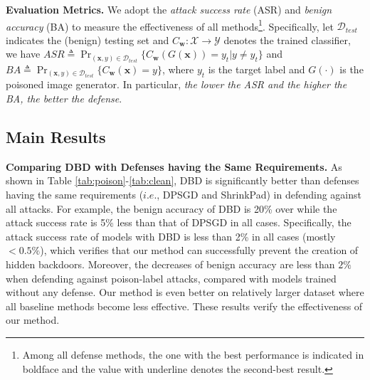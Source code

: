 \noindent \textbf{Evaluation Metrics.} 
We adopt the \emph{attack success rate} (ASR) and \emph{benign accuracy} (BA) to measure the effectiveness of all methods\footnote{Among all defense methods, the one with the best performance is indicated in boldface and the value with underline denotes the second-best result.}. Specifically, let $\mathcal{D}_{test}$ indicates the (benign) testing set and $C_{\bm{w}}: \mathcal{X} \rightarrow \mathcal{Y}$ denotes the trained classifier, we have $ASR \triangleq \Pr_{(\bm{x},y) \in \mathcal{D}_{test}}\{C_{\bm{w}}(G(\bm{x}))=y_t|y \neq y_t\}$ and $BA \triangleq \Pr_{(\bm{x},y) \in \mathcal{D}_{test}}\{C_{\bm{w}}(\bm{x})=y\}$, where $y_t$ is the target label and $G(\cdot)$ is the poisoned image generator. In particular, \emph{the lower the ASR and the higher the BA, the better the defense}. 

\subsection{Main Results}
\label{sec:main}

\noindent \textbf{Comparing DBD with Defenses having the Same Requirements.}
As shown in Table \ref{tab:poison}-\ref{tab:clean}, DBD is significantly better than defenses having the same requirements ($i.e.$, DPSGD and ShrinkPad) in defending against all attacks. For example, the benign accuracy of DBD is 20\% over while the attack success rate is 5\% less than that of DPSGD in all cases. Specifically, the attack success rate of models with DBD is less than 2\% in all cases (mostly $< 0.5\%$), which verifies that our method can successfully prevent the creation of hidden backdoors. Moreover, the decreases of benign accuracy are less than $2\%$ when defending against poison-label attacks, compared with models trained without any defense. Our method is even better on relatively larger dataset where all baseline methods become less effective. These results verify the effectiveness of our method.


